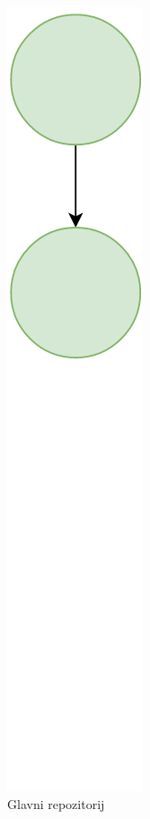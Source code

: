 \documentclass[times, utf8, diplomski, numeric]{fer}
\begin{document}
\begin{figure}[b!]
\centering
\begin{subfigure}{.24\textwidth}
\centering
\includegraphics[scale=0.4]{VersioningTreeA}
\caption{Glavni repozitorij}
\label{fig:VersioningTreeA}
\end{subfigure}
\begin{subfigure}{.24\textwidth}
\centering

\end{subfigure}
\end{figure}
\end{document}
